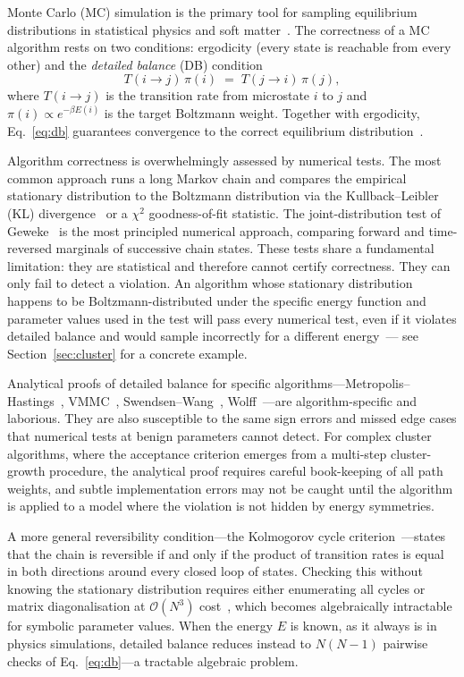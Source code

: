 \documentclass[twocolumn,10pt]{article}
\begin{document}
Monte Carlo (MC) simulation is the primary tool for sampling equilibrium
distributions in statistical physics and soft
matter~\cite{Metropolis1953,Frenkel2002,Allen1987}.  The correctness of a MC
algorithm rests on two conditions: ergodicity (every state is reachable from
every other) and the \emph{detailed balance} (DB) condition
\begin{equation}
  T(i \to j)\,\pi(i) \;=\; T(j \to i)\,\pi(j),
  \label{eq:db}
\end{equation}
where $T(i\to j)$ is the transition rate from microstate $i$ to $j$ and
$\pi(i)\propto e^{-\beta E(i)}$ is the target Boltzmann weight.  Together
with ergodicity, Eq.~\eqref{eq:db} guarantees convergence to the correct
equilibrium distribution~\cite{Levin2009}.

Algorithm correctness is overwhelmingly assessed by numerical tests.  The
most common approach runs a long Markov chain and compares the empirical
stationary distribution to the Boltzmann distribution via the
Kullback--Leibler (KL) divergence~\cite{Newman1999} or a $\chi^2$
goodness-of-fit statistic.  The joint-distribution test of
Geweke~\cite{Geweke2004} is the most principled numerical approach,
comparing forward and time-reversed marginals of successive chain states.
These tests share a fundamental limitation: they are statistical and
therefore cannot certify correctness.  They can only fail to detect a
violation.  An algorithm whose stationary distribution happens to be
Boltzmann-distributed under the specific energy function and parameter values
used in the test will pass every numerical test, even if it violates detailed
balance and would sample incorrectly for a different energy~--- see
Section~\ref{sec:cluster} for a concrete example.

Analytical proofs of detailed balance for specific algorithms---Metropolis--Hastings~\cite{Hastings1970},
VMMC~\cite{Whitelam2007,Whitelam2009}, Swendsen--Wang~\cite{SwendsenWang1987},
Wolff~\cite{Wolff1989}---are algorithm-specific and laborious.  They are
also susceptible to the same sign errors and missed edge cases that numerical
tests at benign parameters cannot detect.  For complex cluster algorithms,
where the acceptance criterion emerges from a multi-step cluster-growth
procedure, the analytical proof requires careful book-keeping of all path
weights, and subtle implementation errors may not be caught until the
algorithm is applied to a model where the violation is not hidden by energy
symmetries.

A more general reversibility condition---the Kolmogorov cycle
criterion~\cite{Kelly1979}---states that the chain is reversible if and only
if the product of transition rates is equal in both directions around every
closed loop of states.  Checking this without knowing the stationary
distribution requires either enumerating all cycles or matrix
diagonalisation at $\mathcal{O}(N^3)$ cost~\cite{Norris1998}, which becomes
algebraically intractable for symbolic parameter values.  When the energy $E$
is known, as it always is in physics simulations, detailed balance reduces
instead to $N(N-1)$ pairwise checks of Eq.~\eqref{eq:db}---a tractable
algebraic problem.
\end{document}
